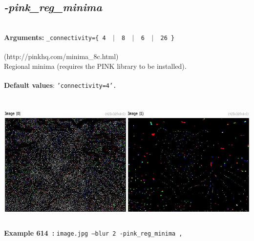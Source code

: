 \documentclass[a4paper,11pt,twoside]{book}
\begin{document}
\subsection{\emph{-pink\_reg\_minima} }\vspace*{-0.5em}
~\\\textbf{Arguments: } 
{\small \texttt{\_connectivity=\{ 4 ~$|$~ 8 ~$|$~ 6 ~$|$~ 26 \}}}\\~\\
(http://pinkhq.com/minima\_8c.html)
~\\Regional minima (requires the PINK library to be installed).
~\\~\\\textbf{Default values}: {\small \texttt{'connectivity=4'.}}
\begin{center}\includegraphics[keepaspectratio=true,height=7cm,width=\textwidth]{img/gmic_def614.jpg}\\
{\footnotesize \textbf{Example 614~:} \texttt{image.jpg --blur 2 -pink\_reg\_minima ,}}
\end{center}
\end{document}
